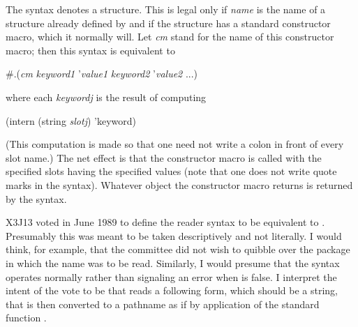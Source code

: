 \begin{flushdesc}
\item[\cd{\#S}]
The syntax 
denotes a structure.  This is legal only if {\it name} is the name
of a structure already defined by  and if the
structure has a standard constructor macro, which it normally will.
Let {\it cm} stand for the name of this constructor macro;
then this syntax is equivalent to
\begin{lisp}
\#.({\it cm} {\it keyword1} '{\it value1} {\it keyword2} '{\it value2} ...)
\end{lisp}
where each {\it keywordj} is the result of computing
\begin{lisp}
(intern (string {\it slotj}) 'keyword)
\end{lisp}
(This computation is made so that one need not write a colon in
front of every slot name.)
The net effect is that the constructor macro is called
with the specified slots
having the specified values (note that one does not write quote marks
in the  syntax).  Whatever object the constructor macro returns
is returned by the  syntax.
\end{flushdesc}

\begin{newer}
\begin{flushdesc}
\item[\cd{\#P}]
X3J13 voted in June 1989 
to define the reader syntax  to be equivalent to
.  Presumably this was meant to
be taken descriptively and not literally.  I would think, for example,
that the committee did not wish to quibble over the package in which
the name  was to be read.  Similarly, I would
presume that the  syntax operates normally rather than signaling
an error when  is false.  I interpret the intent
of the vote to be that  reads a following form, which should be
a string, that is then converted to a pathname as if by application
of the standard function .
\end{flushdesc}
\end{newer}

